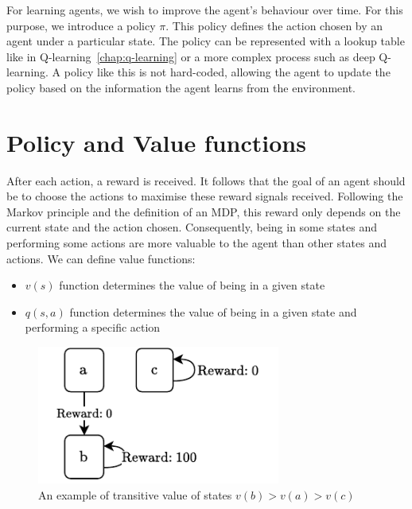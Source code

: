 \documentclass[]{final_report}
\begin{document}
\label{policy-informal-definition}
For learning agents, we wish to improve the agent's behaviour over time. For this purpose, we introduce a policy $\pi$. This policy defines the action chosen by an agent under a particular state. The policy can be represented with a lookup table like in Q-learning~\ref{chap:q-learning} or a more complex process such as deep Q-learning. A policy like this is not hard-coded, allowing the agent to update the policy based on the information the agent learns from the environment. 


\section{Policy and Value functions}

After each action, a reward is received. It follows that the goal of an agent should be to choose the actions to maximise these reward signals received. Following the Markov principle and the definition of an MDP, this reward only depends on the current state and the action chosen. Consequently, being in some states and performing some actions are more valuable to the agent than other states and actions. We can define value functions: 
\begin{itemize}
  \item $v(s)$ function determines the value of being in a given state
  \item $q(s, a)$ function determines the value of being in a given state and performing a specific action
\end{itemize}



\begin{figure}[H]
  \centering
  
  \includegraphics[width=8cm]{reward-example-2}
  
  \caption{\label{fig:reward-example} An example of transitive value of states $v(b) > v(a) > v(c)$}
\end{figure}
\end{document}
